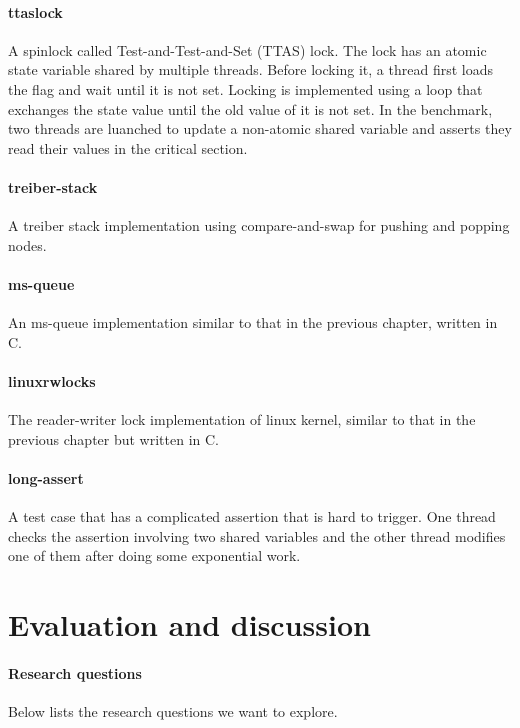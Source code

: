 \paragraph{ttaslock} A spinlock called Test-and-Test-and-Set (TTAS) lock. The lock has an atomic state variable shared by multiple threads. Before locking it, a thread first loads the flag and wait until it is not set. Locking is implemented using a loop that exchanges the state value until the old value of it is not set. In the benchmark, two threads are luanched to update a non-atomic shared variable and asserts they read their values in the critical section.

\paragraph{treiber-stack} A treiber stack\cite{treiber-stack} implementation using compare-and-swap for pushing and popping nodes.

\paragraph{ms-queue} An ms-queue implementation similar to that in the previous chapter, written in C.

\paragraph{linuxrwlocks} The reader-writer lock implementation of linux kernel, similar to that in the previous chapter but written in C.

\paragraph{long-assert} A test case that has a complicated assertion that is hard to trigger. One thread checks the assertion involving two shared variables and the other thread modifies one of them after doing some exponential work.

\section{Evaluation and discussion}

\paragraph*{Research questions} Below lists the research questions we want to explore.

